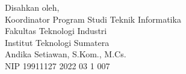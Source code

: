 \begin{center}
	\begin{center}
		\fontsize{10pt}{12pt}
		Disahkan oleh,\\
		Koordinator Program Studi Teknik Informatika\\
		Fakultas Teknologi Industri\\
		Institut Teknologi Sumatera
		\vspace{2cm}\\
		Andika Setiawan, S.Kom., M.Cs. \\ %
		NIP 19911127 2022 03 1 007 \\
	\end{center}
	\vfill

\end{center}
\clearpage

